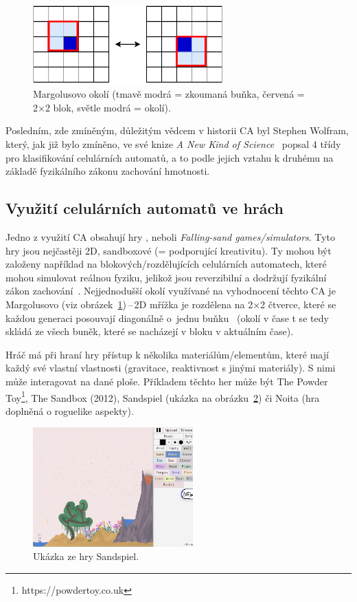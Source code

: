 \begin{figure}[H]
    \centering
    \includegraphics[width=0.65\textwidth]{obrazky-figures/ch2/Margolus.pdf}
    \caption{Margolusovo okolí (tmavě modrá = zkoumaná buňka, červená = 2×2 blok, světle modrá = okolí).}
    \label{fig:Margolus}
\end{figure}

Posledním, zde zmíněným, důležitým vědcem v historii CA byl Stephen Wolfram, který, jak již bylo zmíněno, ve své knize \textit{A New Kind of Science}~\cite{wolfram-NewKindOfScience} popsal 4 třídy pro klasifikování celulárních automatů, a to podle jejich vztahu k druhému na základě fyzikálního zákonu zachování hmotnosti.

\subsection*{Využití celulárních automatů ve hrách}
Jedno z využití CA obsahují hry , neboli \textit{Falling-sand games/simulators}. Tyto hry jsou nejčastěji 2D, sandboxové (= podporující kreativitu). Ty mohou být založeny například na blokových/rozdělujících celulárních automatech, které mohou simulovat reálnou fyziku, jelikož jsou reverzibilní a dodržují fyzikální zákon zachování~\cite{schiff2011cellular}. Nejjednodušší okolí využívané na vyhodnocení těchto CA je Margolusovo (viz obrázek~\ref{fig:Margolus})\,--\,2D mřížka je rozdělena na 2×2 čtverce, které se každou generaci posouvají diagonálně o~jednu buňku~\cite{schiff2011cellular} (okolí v čase t se tedy skládá ze všech buněk, které se nacházejí v bloku v aktuálním čase).

\noindent Hráč má při hraní hry přístup k několika materiálům/elementům, které mají každý své vlastní vlastnosti (gravitace, reaktivnost s jinými materiály).  S nimi může interagovat na dané ploše. Příkladem těchto her může být The Powder Toy\footnote{https://powdertoy.co.uk}, The Sandbox (2012), Sandspiel (ukázka na obrázku~\ref{fig:Sandspiel}) či Noita (hra doplněná o roguelike aspekty).
\begin{figure}[H]
    \centering
    \includegraphics[width=0.55\textwidth]{obrazky-figures/ch2/SandSpiel.png}
    \caption{Ukázka ze hry Sandspiel.}
    \label{fig:Sandspiel}
\end{figure}

